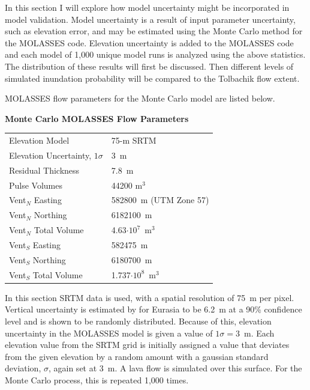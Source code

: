 \documentclass[12pt,letter]{article}
\begin{document}



In this section I will explore how model uncertainty might be incorporated in model validation. Model uncertainty is a result of input parameter uncertainty, such as elevation error, and may be estimated using the Monte Carlo method for the MOLASSES code. Elevation uncertainty is added to the MOLASSES code and each model of 1,000 unique model runs is analyzed using the above statistics. The distribution of these results will first be discussed. Then different levels of simulated inundation probability will be compared to the Tolbachik flow extent.

MOLASSES flow parameters for the Monte Carlo model are listed below. 
\begin{center}
	\textbf{Monte Carlo MOLASSES Flow Parameters}\\
	\begin{tabular}{l l}
		\toprule
		Elevation Model & 75-m SRTM\\
		Elevation Uncertainty, $1\sigma$ & 3~m\\
		Residual Thickness & 7.8~m\\
		Pulse Volumes & 44200 m$^3$\\
		\midrule
		Vent$_N$ Easting & 582800~m (UTM Zone 57)\\
		Vent$_N$ Northing & 6182100~m\\
		Vent$_N$ Total Volume & 4.63$\cdot10^7$~m$^3$\\
		\midrule
		Vent$_S$ Easting & 582475~m\\
		Vent$_S$ Northing & 6180700~m\\
		Vent$_S$ Total Volume & 1.737$\cdot10^8$~m$^3$\\
		\bottomrule
	\end{tabular}
\end{center}
In this section SRTM data is used, with a spatial resolution of 75~m per pixel. Vertical uncertainty is estimated by \citet{rodriguez2006global} for Eurasia to be 6.2~m at a 90\% confidence level and is shown to be randomly distributed. Because of this, elevation uncertainty in the MOLASSES model is given a value of $1\sigma=3$~m. Each elevation value from the SRTM grid is initially assigned a value that deviates from the given elevation by a random amount with a gaussian standard deviation, $\sigma$, again set at 3~m. A lava flow is simulated over this surface. For the Monte Carlo process, this is repeated 1,000 times.
\end{document}
